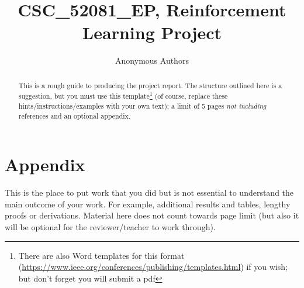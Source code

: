 \documentclass[journal, a4paper]{IEEEtran}
\begin{document}
\title{CSC\_52081\_EP, Reinforcement Learning Project}
\author{Anonymous Authors}
\maketitle

\begin{abstract}
	This is a rough guide to producing the project report. 
	The structure outlined here is a suggestion, but you must use this template\footnote{There are also Word templates for this format (\url{https://www.ieee.org/conferences/publishing/templates.html}) if you wish; but don't forget you will submit a pdf} (of course, replace these hints/instructions/examples with your own text); a limit of 5 pages \emph{not including} references and an optional appendix. 
\end{abstract}







\newpage
\section*{Appendix}
This is the place to put work that you did but is not essential to understand the main outcome of your work. For example, additional results and tables, lengthy proofs or derivations. Material here does not count towards page limit (but also it will be optional for the reviewer/teacher to work through). 
\end{document}
